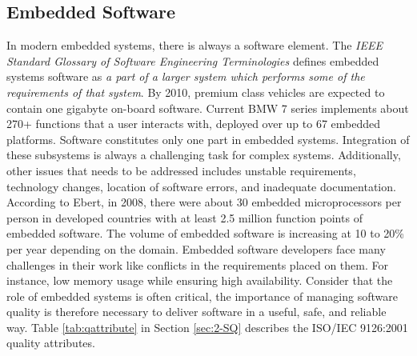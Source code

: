 {\subsection{Embedded Software}
In modern embedded systems, there is always a software element. The \textit{IEEE Standard Glossary of Software Engineering Terminologies} defines embedded systems software as \textit{a part of a larger system which performs some of the requirements of that system}\cite{radatz1990ieee}. By 2010, premium class vehicles are expected to contain one gigabyte on-board software\cite{pretschner2007software,ebert2009embedded}. Current BMW 7 series implements about 270+ functions that a user interacts with, deployed over up to 67 embedded platforms\cite{pretschner2007software}. Software constitutes only one part in embedded systems. Integration of these subsystems is always a challenging task for complex systems\cite{pretschner2007software}. Additionally, other issues that needs to be addressed includes unstable requirements, technology changes, location of software errors, and inadequate documentation\cite{jimenez2013introduction}. According to Ebert, in 2008, there were about 30 embedded microprocessors per person in developed countries with at least 2.5 million function points of embedded software. The volume of embedded software is increasing at 10 to 20\% per year depending on the domain\cite{ebert2009embedded}. Embedded software developers face many challenges in their work like conflicts in the requirements placed on them. For instance, low memory usage while ensuring high availability\cite{vulgarakis2008embedded}. Consider that the role of embedded systems is often critical, the importance of managing software quality is therefore necessary to deliver software in a useful, safe, and reliable way. Table \ref{tab:qattribute} in Section \ref{sec:2-SQ} describes the ISO/IEC 9126:2001 quality attributes.


}
